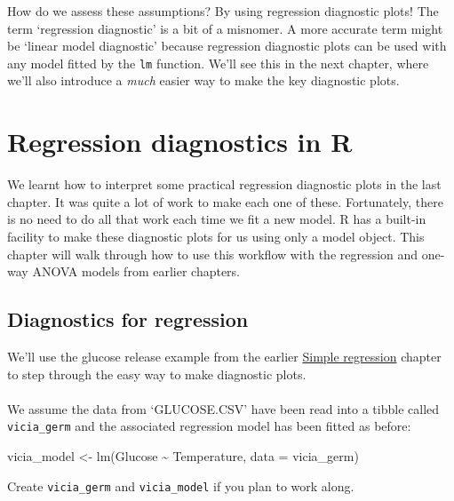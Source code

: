 \documentclass[
]{book}
\newenvironment{Shaded}{\begin{snugshade}}{\end{snugshade}}
\newcommand{\AttributeTok}[1]{\textcolor[rgb]{0.77,0.63,0.00}{#1}}
\newcommand{\FunctionTok}[1]{\textcolor[rgb]{0.00,0.00,0.00}{#1}}
\newcommand{\NormalTok}[1]{#1}
\newcommand{\OtherTok}[1]{\textcolor[rgb]{0.56,0.35,0.01}{#1}}
\newcommand{\SpecialCharTok}[1]{\textcolor[rgb]{0.00,0.00,0.00}{#1}}
\newenvironment{greybox}{
  \definecolor{shadecolor}{rgb}{0.95,0.95,0.95}  %
  \color{black}
  \begin{shaded}}
 {\end{shaded}}
\newenvironment{infobox}[1]
  {
  \begin{itemize}
  \renewcommand{\labelitemi}{
    \raisebox{-.7\height}[0pt][0pt]{
      {\setkeys{Gin}{width=3em,keepaspectratio}
        \texttt{[image: images/\#1]}}
    }
  }
  \setlength{\fboxsep}{1em}
  \begin{greybox}
  \item
  }
  {
  \end{greybox}
  \end{itemize}
  }
\begin{document}
How do we assess these assumptions? By using regression diagnostic plots! The term `regression diagnostic' is a bit of a misnomer. A more accurate term might be `linear model diagnostic' because regression diagnostic plots can be used with any model fitted by the \texttt{lm} function. We'll see this in the next chapter, where we'll also introduce a \emph{much} easier way to make the key diagnostic plots.

\hypertarget{regression-diagnostics-in-r}{%
\chapter{Regression diagnostics in R}\label{regression-diagnostics-in-r}}

We learnt how to interpret some practical regression diagnostic plots in the last chapter. It was quite a lot of work to make each one of these. Fortunately, there is no need to do all that work each time we fit a new model. R has a built-in facility to make these diagnostic plots for us using only a model object. This chapter will walk through how to use this workflow with the regression and one-way ANOVA models from earlier chapters.

\hypertarget{diagnostics-for-regression}{%
\section{Diagnostics for regression}\label{diagnostics-for-regression}}

We'll use the glucose release example from the earlier \protect\hyperlink{regression-in-R}{Simple regression} chapter to step through the easy way to make diagnostic plots.

\begin{infobox}{action}

\hypertarget{section-13}{%
\subsubsection*{}\label{section-13}}

We assume the data from `GLUCOSE.CSV' have been read into a tibble called \texttt{vicia\_germ} and the associated regression model has been fitted as before:

\begin{Shaded}
\begin{Highlighting}[]
\NormalTok{vicia\_model }\OtherTok{\textless{}{-}} \FunctionTok{lm}\NormalTok{(Glucose }\SpecialCharTok{\textasciitilde{}}\NormalTok{ Temperature, }\AttributeTok{data =}\NormalTok{ vicia\_germ)}
\end{Highlighting}
\end{Shaded}

Create \texttt{vicia\_germ} and \texttt{vicia\_model} if you plan to work along.

\end{infobox}
\end{document}
